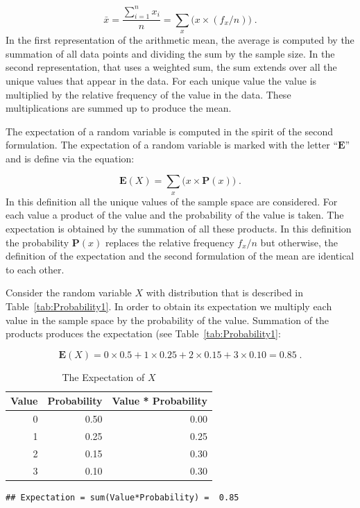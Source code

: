 \documentclass[
]{krantz}
\newcommand{\Expec}{\mathbf{E}}
\newcommand{\Prob}{\mathbf{P}}
\theoremstyle{definition}
\theoremstyle{definition}
\theoremstyle{definition}
\theoremstyle{remark}
\begin{document}
\[\bar x = \frac{\sum_{i=1}^n x_i}{n} = \sum_x \big(x \times (f_x/n)\big)\;.\]
In the first representation of the arithmetic mean, the average is
computed by the summation of all data points and dividing the sum by the
sample size. In the second representation, that uses a weighted sum, the
sum extends over all the unique values that appear in the data. For each
unique value the value is multiplied by the relative frequency of the
value in the data. These multiplications are summed up to produce the
mean.

The expectation of a random variable is computed in the spirit of the
second formulation. The expectation of a random variable is marked with
the letter ``\(\Expec\)'' and is define via the equation:

\[\Expec(X) = \sum_x \big(x \times \Prob(x)\big)\;.\] In this definition
all the unique values of the sample space are considered. For each value
a product of the value and the probability of the value is taken. The
expectation is obtained by the summation of all these products. In this
definition the probability \(\Prob(x)\) replaces the relative frequency
\(f_x/n\) but otherwise, the definition of the expectation and the second
formulation of the mean are identical to each other.

Consider the random variable \(X\) with distribution that is described in
Table~\ref{tab:Probability1}. In order to obtain its expectation we
multiply each value in the sample space by the probability of the value.
Summation of the products produces the expectation (see
Table~\ref{tab:Probability1}:

\[\Expec(X) = 0 \times 0.5 + 1 \times 0.25 + 2 \times 0.15 + 3\times 0.10 = 0.85\;.\]

\begin{table}[t]

\caption{\label{tab:Probability2}The Expectation of $X$}
\centering
\begin{tabular}{rrr}
\toprule
Value & Probability & Value * Probability\\
\midrule
0 & 0.50 & 0.00\\
1 & 0.25 & 0.25\\
2 & 0.15 & 0.30\\
3 & 0.10 & 0.30\\
\bottomrule
\end{tabular}
\end{table}

\begin{verbatim}
## Expectation = sum(Value*Probability) =  0.85
\end{verbatim}
\end{document}
